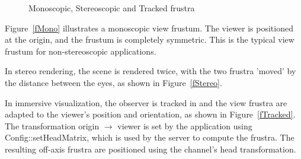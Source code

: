 \documentclass[10pt,a4]{scrartcl}
\newcommand{\fig}[1]{Figure~\ref{#1}}
\begin{document}
\begin{figure}[h!t]
  \hfil
  \hfil
  {\caption{\small\label{fImmersive}Monoscopic, Stereoscopic and Tracked
    frustra}}
\end{figure}

\fig{fMono} illustrates a monoscopic view frustum. The viewer is
positioned at the origin, and the frustum is completely symmetric. This
is the typical view frustum for non-stereoscopic applications.

In stereo rendering, the scene is rendered twice, with the two frustra
'moved' by the distance between the eyes, as shown in \fig{fStereo}.

In immersive visualization, the observer is tracked in and the view
frustra are adapted to the viewer's position and orientation, as shown
in \fig{fTracked}. The transformation origin $\rightarrow$ viewer is set by
the application using \textsf{Config::setHeadMatrix}, which is used by
the server to compute the frustra. The resulting off-axis frustra are
positioned using the channel's head transformation.

{\footnotesize\begin{lstlisting}
\end{lstlisting}}
\fi
\end{document}
